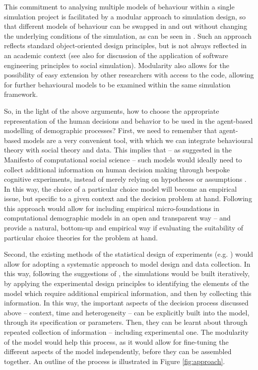 \documentclass{article}
\begin{document}
This commitment to analysing multiple models of behaviour within a single simulation project is facilitated by a modular approach to simulation design, so that different models of behaviour can be swapped in and out without changing the underlying conditions of the simulation, as can be seen in \citet{Gray2016}. Such an approach reflects standard object-oriented design principles, but is not always reflected in an academic context (see also \citet{Rossiter2015} for discussion of the application of software engineering principles to social simulation). Modularity also allows for the possibility of easy extension by other researchers with access to the code, allowing for further behavioural models to be examined within the same simulation framework.

So, in the light of the above arguments, how to choose the appropriate representation of the human decisions and behavior to be used in the agent-based modelling of demographic processes? First, we need to remember that agent-based models are a very convenient tool, with which we can integrate behavioural theory with social theory and data. This implies that – as suggested in the Manifesto of computational social science \citep{Conte} – such models would ideally need to collect additional information on human decision making through bespoke cognitive experiments, instead of merely relying on hypotheses or assumptions \citep{Courgeau}. In this way, the choice of a particular choice model will become an empirical issue, but specific to a given context and the decision problem at hand. Following this approach would allow for including empirical micro-foundations in computational demographic models in an open and transparent way – and provide a natural, bottom-up and empirical way if evaluating the suitability of particular choice theories for the problem at hand.


Second, the existing methods of the statistical design of experiments (e.g. \citeauthor{Chaloner} \citeyear{Chaloner}) would allow for adopting a systematic approach to model design and data collection. In this way, following the suggestions of \citet{Courgeau}, the simulations would be built iteratively, by applying the experimental design principles to identifying the elements of the model which require additional empirical information, and then by collecting this information.  In this way, the important aspects of the decision process discussed above – context, time and heterogeneity – can be explicitly built into the model, through its specification or parameters. Then, they can be learnt about through repeated collection of information – including experimental one. The modularity of the model would help this process, as it would allow for fine-tuning the different aspects of the model independently, before they can be assembled together. An outline of the process is illustrated in Figure \ref{fig:approach}.
\end{document}
